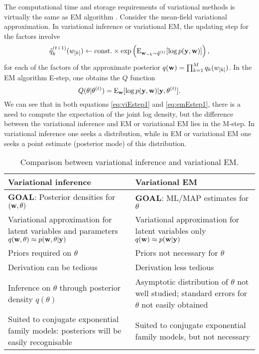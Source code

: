 The computational time and storage requirements of variational methods is virtually the same as EM algorithm \citep{beal2003variational,blei2017variational}.
Consider the mean-field variational approximation.
In variational inference or variational EM, the updating step for the factors involve
\begin{equation}\label{eq:viEstep1}
  \tilde q_k^{(t+1)}(w_{[k]}) \gets \text{const.}\hspace{0.01em} \times \exp \left( \operatorname{E}_{{\mathbf w}_{-k}\sim\tilde q^{(t)}}[\log p({\mathbf y},{\mathbf w})]\right),
\end{equation}
for each of the factors of the approximate posterior $q({\mathbf w}) = \prod_{k=1}^M q_k(w_{[k]})$.
In the EM algorithm E-step, one obtains the $Q$ function
\begin{equation}\label{eq:emEstep1}
  Q(\theta|\theta^{(t)}) = \operatorname{E}_{{\mathbf w}}[\log p({\mathbf y},{\mathbf w})|{\mathbf y},\theta^{(t)}].
\end{equation}
We can see that in both equations \cref{eq:viEstep1} and \cref{eq:emEstep1}, there is a need to compute the expectation of the joint log density, but the difference between the variational inference and EM or variational EM lies in the M-step.
In variational inference one seeks a distribution, while in EM or variational EM one seeks a point estimate (posterior mode) of this distribution.

{\renewcommand{\arraystretch}{1.5}
\begin{table}[]
\centering
\caption{Comparison between variational inference and variational EM.}
\label{tab:vivemcompare}
\begin{tabular}{p{6.5cm}p{6.5cm}}
\toprule
Variational inference & Variational EM\\ 
\midrule
\textbf{GOAL}: Posterior densities for $({\mathbf w}, \theta)$                                                          
& \textbf{GOAL}: ML/MAP estimates for $\theta$ \\
Variational approximation for latent variables and parameters $q({\mathbf w},\theta)\approx p({\mathbf w},\theta|{\mathbf y})$ 
& Variational approximation for latent variables only $q({\mathbf w})\approx p({\mathbf w}|{\mathbf y})$ \\
Priors required on $\theta$                                                                            
& Priors not necessary for $\theta$ \\
Derivation can be tedious 
& Derivation less tedious \\
Inference on $\theta$ through posterior density $q(\theta)$
& Asymptotic distribution of $\theta$ not well studied; standard errors for $\theta$ not easily obtained \\
Suited to conjugate exponential family models: posteriors will be easily recognisable
& Suited to conjugate exponential family models, but not necessary \\
\bottomrule
\end{tabular}
\end{table}
}


